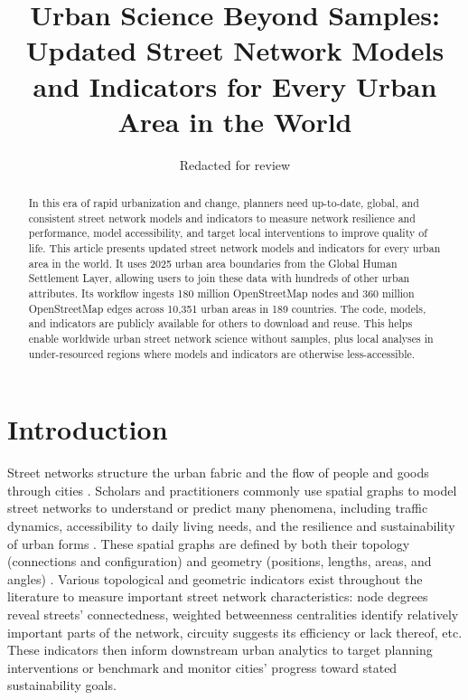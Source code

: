 \documentclass[12pt,letterpaper]{article} %
\makeatletter
\newcommand{\myname}{Geoff Boeing}
\newcommand{\myemail}{boeing@usc.edu}
\newcommand{\myaffiliation}{Department of Urban Planning and Spatial Analysis\\University of Southern California}
\newcommand{\paperdate}{April 2025}
\newcommand{\papertitle}{Urban Science Beyond Samples: Updated Street Network Models and Indicators for Every Urban Area in the World}
\newcommand{\papercitation}{Boeing, G. 2025. \papertitle. Under review at \textit{Journal Name}.}
\makeatother
\begin{document}
\title{\papertitle}%
\author[]{Redacted for review}%
\date{}%

\maketitle

\begin{abstract}
In this era of rapid urbanization and change, planners need up-to-date, global, and consistent street network models and indicators to measure network resilience and performance, model accessibility, and target local interventions to improve quality of life. This article presents updated street network models and indicators for every urban area in the world. It uses 2025 urban area boundaries from the Global Human Settlement Layer, allowing users to join these data with hundreds of other urban attributes. Its workflow ingests 180 million OpenStreetMap nodes and 360 million OpenStreetMap edges across 10,351 urban areas in 189 countries. The code, models, and indicators are publicly available for others to download and reuse. This helps enable worldwide urban street network science without samples, plus local analyses in under-resourced regions where models and indicators are otherwise less-accessible.
\end{abstract}


\section{Introduction}

Street networks structure the urban fabric and the flow of people and goods through cities \citep{barrington-leigh_global_2020}. Scholars and practitioners commonly use spatial graphs to model street networks to understand or predict many phenomena, including traffic dynamics, accessibility to daily living needs, and the resilience and sustainability of urban forms \citep{barthelemy_spatial_2022}. These spatial graphs are defined by both their topology (connections and configuration) and geometry (positions, lengths, areas, and angles) \citep{fischer_spatial_2014}. Various topological and geometric indicators exist throughout the literature to measure important street network characteristics: node degrees reveal streets' connectedness, weighted betweenness centralities identify relatively important parts of the network, circuity suggests its efficiency or lack thereof, etc. These indicators then inform downstream urban analytics to target planning interventions or benchmark and monitor cities' progress toward stated sustainability goals.
\end{document}
